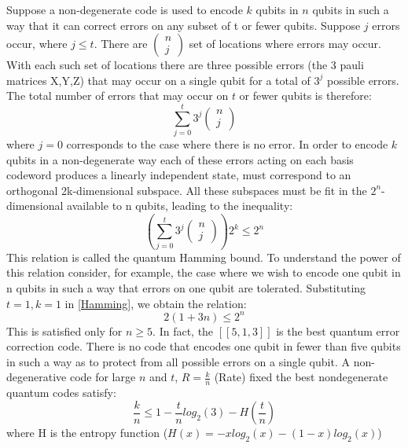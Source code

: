 Suppose a non-degenerate code is used to encode $k$ qubits in $n$ qubits in such a way that it can correct errors on any subset of t or fewer qubits. Suppose $j$ errors occur, where $j\leq t$. There are $\left(\begin{array}{c}
     n\\
     j
\end{array}\right)$ set of locations where errors may occur. With each such set of locations there are three possible errors (the 3 pauli matrices X,Y,Z) that may occur on a single qubit for a total of $3^j$ possible errors. The total number of errors that may occur on $t$ or fewer qubits is therefore: 
\begin{equation*}
    \sum_{j=0}^t 3^j\left(\begin{array}{c}
     n\\
     j
\end{array}\right)
\end{equation*}
where $j=0$ corresponds to the case where there is no error. In order to encode $k$ qubits in a non-degenerate way each of these errors acting on each basis codeword produces a linearly independent state, must correspond to an orthogonal 2k-dimensional subspace. All these subspaces must be fit in the $2^n$-dimensional available to n qubits, leading to the inequality:
\begin{equation}
    \left(\sum_{j=0}^t 3^j\left(\begin{array}{c}
     n\\
     j
\end{array}\right)\right)2^k \leq 2^n
\label{Hamming}
\end{equation}
This relation is called the quantum Hamming bound. 
To understand the power of this relation consider, for example, the case where we wish to encode one qubit in n qubits in such a way that errors on one qubit are tolerated.
Substituting $t=1,k=1$ in \ref{Hamming}, we obtain the relation: 
\begin{equation*}
    2(1+3n)\leq2^n
\end{equation*}
This is satisfied only for $n\geq 5$. In fact, the $[[5,1,3]]$ is the best quantum error correction code. There is no code that encodes one qubit in fewer than five qubits in such a way as to protect from all possible errors on a single qubit.
A non-degenerative code for large $n$ and $t$, $R=\frac{k}{n}$ (Rate) fixed the best nondegenerate quantum codes satisfy: 
\begin{equation*}
    \frac{k}{n} \leq 1 - \frac{t}{n}log_2(3) - H(\frac{t}{n})
\end{equation*}
where H is the entropy function ($H(x)=-xlog_2(x) -(1-x)log_2(x)$)